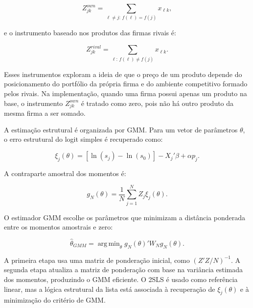 \documentclass[12pt,a4paper]{article}
\DeclareMathOperator*{\argmin}{arg\,min}
\begin{document}
\begin{equation}
    Z^{own}_{jk}
    =
    \sum_{\ell\neq j:\,f(\ell)=f(j)}x_{\ell k},
    \label{eq:instrumento_own}
\end{equation}

e o instrumento baseado nos produtos das firmas rivais é:

\begin{equation}
    Z^{rival}_{jk}
    =
    \sum_{\ell:\,f(\ell)\neq f(j)}x_{\ell k}.
    \label{eq:instrumento_rival}
\end{equation}

Esses instrumentos exploram a ideia de que o preço de um produto depende do posicionamento do portfólio da própria firma e do ambiente competitivo formado pelos rivais. Na implementação, quando uma firma possui apenas um produto na base, o instrumento \(Z^{own}_{jk}\) é tratado como zero, pois não há outro produto da mesma firma a ser somado.

A estimação estrutural é organizada por GMM. Para um vetor de parâmetros \(\theta\), o erro estrutural do logit simples é recuperado como:

\begin{equation}
    \xi_j(\theta)
    =
    \left[\ln(s_j)-\ln(s_0)\right]
    -
    X_j'\beta
    +
    \alpha p_j.
    \label{eq:erro_estrutural_logit}
\end{equation}

A contraparte amostral dos momentos é:

\begin{equation}
    g_N(\theta)
    =
    \frac{1}{N}
    \sum_{j=1}^{N}
    Z_j\xi_j(\theta).
    \label{eq:momentos_gmm}
\end{equation}

O estimador GMM escolhe os parâmetros que minimizam a distância ponderada entre os momentos amostrais e zero:

\begin{equation}
    \widehat{\theta}_{GMM}
    =
    \argmin_{\theta}
    g_N(\theta)'W_Ng_N(\theta).
    \label{eq:criterio_gmm}
\end{equation}

A primeira etapa usa uma matriz de ponderação inicial, como \((Z'Z/N)^{-1}\). A segunda etapa atualiza a matriz de ponderação com base na variância estimada dos momentos, produzindo o GMM eficiente. O 2SLS é usado como referência linear, mas a lógica estrutural da lista está associada à recuperação de \(\xi_j(\theta)\) e à minimização do critério de GMM.
\end{document}
